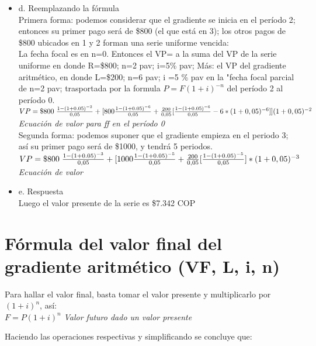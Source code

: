 \begin{itemize}
		\item d. Reemplazando la fórmula\\
		Primera forma: podemos considerar que el gradiente se inicia en el período 2; entonces su primer pago será de \$800 (el que está en 3); los otros pagos de \$800 ubicados en 1 y 2 forman una serie uniforme vencida:\\
		
		La fecha focal es en n=0.
        Entonces el VP= a la suma del VP de la serie uniforme en donde R=\$800; n=2 pav; i=5\% pav; Más: el VP del gradiente aritmético, en donde L=\$200; n=6 pav; i =5 \% pav en la "fecha focal parcial de n=2 pav; trasportada por la formula $P=F(1+i)^{-n}$ del período 2 al período 0. \\
        
		$VP = \$800 \hspace {3 pt} \frac{1-(1+0.05)^{-2}}{0,05} + [800\frac{1-(1+0.05)^{-6}}{0,05}+\frac{200}{0,05}[\frac{1-(1+0.05)^{-6}}{0,05}-6*(1+0,05)^{-6}]](1+0,05)^{-2}$ \hspace{35 pt} \textit{Ecuación de valor para ff en el período 0}\\
		
		Segunda forma: podemos suponer que el gradiente empieza en el periodo 3; así su primer pago será de \$1000, y tendrá 5 periodos.\\
		
		$VP = \$800 \hspace {3 pt} \frac{1-(1+0.05)^{-3}}{0,05}+[1000\frac{1-(1+0.05)^{-5}}{0,05}+\frac{200}{0,05}[\frac{1-(1+0.05)^{-5}}{0,05}]*(1+0,05)^{-3}$ \\ \textit{Ecuación de valor}\\
		\item e. Respuesta\\
		Luego el valor presente de la serie es \$7.342 COP
	\end{itemize}
	
	\section{Fórmula del valor final del gradiente aritmético (VF, L, i, n)}
	
	Para hallar el valor final, basta tomar el valor presente y multiplicarlo por $(1+i)^n$, así:\\
	$F= P(1+i)^n$ \hspace{35 pt} \textit{Valor futuro dado un valor presente}
	
	\vspace{2mm}
	Haciendo las operaciones respectivas y simplificando se concluye que:
	
